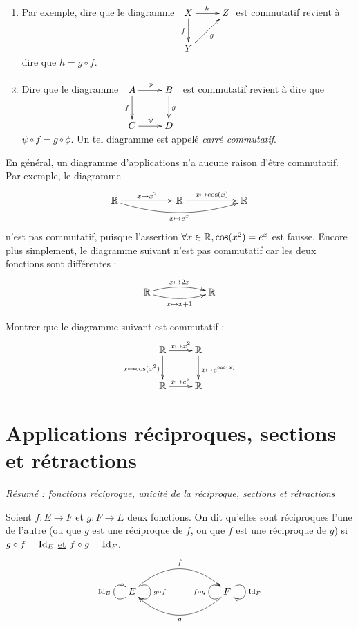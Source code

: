 \begin{exemple}
\begin{enumerate}
\item  Par exemple, dire que le diagramme
$
\xymatrix{
X \ar[d]_{f} \ar[r]^{h}& Z \\
Y \ar[ur]_{g}& 
}
$
est commutatif revient à dire que $h = g\circ f$.
\item Dire que le diagramme 
$\xymatrix{
A \ar[r]^{\phi} \ar[d]_{f} & B \ar[d]^{g}\\
C \ar[r]^{\psi}& D 
}$
est commutatif revient à dire que $\psi\circ f = g \circ \phi$. Un tel diagramme est appelé \emph{carré commutatif}.
\end{enumerate}
\end{exemple}

\begin{attention}
En général, un diagramme d'applications n'a aucune raison d'être commutatif.
Par exemple, le diagramme
\[\xymatrix{
\R \ar[rr]^{x\mapsto x^2} \ar@/_1pc/[rrrr]_{x\mapsto e^x}  & & \R \ar[rr]^{x\mapsto \cos(x)} & & \R
}\]
n'est pas commutatif, puisque l'assertion \og $\forall x\in \mathbb{R}, \cos(x^2)=e^{x}$\fg{} est fausse. Encore plus simplement, le diagramme suivant n'est pas commutatif car les deux fonctions sont différentes :
\[\xymatrix{
\R \ar@/^/[rr]^{x\mapsto 2x} \ar@/_/[rr]_{x\mapsto x+1} & & \R
}\]
\end{attention}

\begin{exercice} Montrer que le diagramme suivant est commutatif :
\[\xymatrix{
\R  \ar[r]^{x\mapsto x^2} \ar[d]_{x\mapsto \cos(x^2)} & \R  \ar[d]^{x\mapsto e^{\cos(x)}}\\
\R  \ar[r]^{x\mapsto e^x}& \R 
}\]
\end{exercice}




\section{Applications réciproques, sections et rétractions}

\emph{Résumé : fonctions réciproque, unicité de la réciproque, sections et rétractions}


\begin{definition}
Soient $f : E\to F$ et $g : F\to E$ deux fonctions. On dit qu'elles sont réciproques l'une de l'autre (ou que $g$ est une réciproque de $f$, ou que $f$ est une réciproque de $g$) si $g\circ f = \operatorname{Id}_E$ \underline{et} $f\circ g = \operatorname{Id}_F$. 
\[
\xymatrix{
 E \ar@(dl,ul)^{\Id_E} \ar@/^2pc/[rrr]^{f} \ar@(ur,dr)^{g\circ f} 
& & & 
\ar@/^2pc/[lll]^{g} \ar@(dl,ul)^{f\circ g} F \ar@(ur,dr)^{\Id_F}
}
\]
\end{definition}



